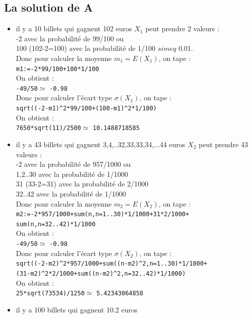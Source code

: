 \documentclass[a4paper,11pt]{book}
\begin{document}
\subsection{La solution de A}
\begin{itemize}
\item il y a 10 billets qui gagnent 102 euros $X_1$ peut prendre 2 valeurs :\\
 -2 avec la probabilit\'e de 99/100 ou \\
100 (102-2=100) avec la probabilit\'e de 1/100 $simeq$ 0.01.\\
Donc pour calculer la moyenne $m_1=E(X_1)$, on tape :\\
{\tt  m1:=-2*99/100+100*1/100}\\
On obtient :\\ 
{\tt  -49/50}$\simeq$ {\tt -0.98}\\
Donc pour calculer l'\'ecart type $\sigma(X_1)$, on tape :\\
{\tt  sqrt((-2-m1)\verb|^|2*99/100+(100-m1)\verb|^|2*1/100)}\\
On obtient :\\ 
{\tt  7650*sqrt(11)/2500}$\simeq$ {\tt  10.1488718585}
\item il y a 43 billets qui gagnent 3,4,..32,33,33,34,...44 euros
$X_2$ peut prendre 43 valeurs :\\
 -2 avec la probabilit\'e de 957/1000 ou \\
1,2..30 avec la probabilit\'e de 1/1000\\
31 (33-2=31) avec la probabilit\'e de 2/1000\\
32..42 avec la probabilit\'e de 1/1000\\
Donc pour calculer la moyenne $m_2=E(X_2)$, on tape :\\
{\tt m2:=-2*957/1000+sum(n,n=1..30)*1/1000+31*2/1000+\\
          sum(n,n=32..42)*1/1000}\\
On obtient :\\ 
{\tt  -49/50}$\simeq$ {\tt -0.98}\\
Donc pour calculer l'\'ecart type $\sigma(X_2)$, on tape :\\
{\tt sqrt((-2-m2)\verb|^|2*957/1000+sum((n-m2)\verb|^|2,n=1..30)*1/1000+\\
     (31-m2)\verb|^|2*2/1000+sum((n-m2)\verb|^|2,n=32..42)*1/1000)}\\
On obtient :\\ 
{\tt  25*sqrt(73534)/1250}$\simeq$ {\tt 5.42343064858}
\item il y a 100 billets qui gagnent 10.2 euros

\end{itemize}
\end{document}

